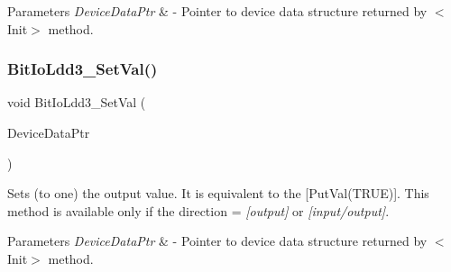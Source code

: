\begin{DoxyParams}{Parameters}
{\em Device\+Data\+Ptr} & -\/ Pointer to device data structure returned by $<$\+Init$>$ method. \\
\hline
\end{DoxyParams}
\mbox{\label{group___bit_io_ldd3__module_ga0db13c2a53c9dc14fa7f51701df5375c}} 
\subsubsection{\texorpdfstring{Bit\+Io\+Ldd3\+\_\+\+Set\+Val()}{BitIoLdd3\_SetVal()}}
{\footnotesize\ttfamily void Bit\+Io\+Ldd3\+\_\+\+Set\+Val (\begin{DoxyParamCaption}\item[{\hyperlink{group___p_e___types__module_gac5cf1362f1f0e3a2ce71b1bf2276d091}{L\+D\+D\+\_\+\+T\+Device\+Data} $\ast$}]{Device\+Data\+Ptr }\end{DoxyParamCaption})}



Sets (to one) the output value. It is equivalent to the \mbox{[}Put\+Val(\+T\+R\+U\+E)\mbox{]}. This method is available only if the direction = {\itshape \mbox{[}output\mbox{]}} or {\itshape \mbox{[}input/output\mbox{]}}. 


\begin{DoxyParams}{Parameters}
{\em Device\+Data\+Ptr} & -\/ Pointer to device data structure returned by $<$\+Init$>$ method. \\
\hline
\end{DoxyParams}
